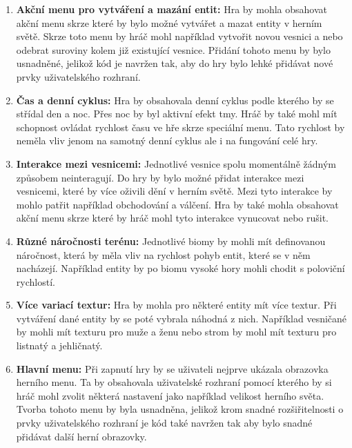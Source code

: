 \begin{enumerate}
    \item \textbf{Akční menu pro vytváření a mazání entit:} Hra by mohla obsahovat akční menu skrze které by bylo možné vytvářet a mazat entity v herním světě. Skrze toto menu by hráč mohl například vytvořit novou vesnici a nebo odebrat suroviny kolem již existující vesnice. Přidání tohoto menu by bylo usnadněné, jelikož kód je navržen tak, aby do hry bylo lehké přidávat nové prvky uživatelského rozhraní. 

    \item \textbf{Čas a denní cyklus:} Hra by obsahovala denní cyklus podle kterého by se střídal den a noc. Přes noc by byl aktivní efekt tmy. Hráč by také mohl mít schopnost ovládat rychlost času ve hře skrze speciální menu. Tato rychlost by neměla vliv jenom na samotný denní cyklus ale i na fungování celé hry.

    \item \textbf{Interakce mezi vesnicemi:} Jednotlivé vesnice spolu momentálně žádným způsobem neinteragují. Do hry by bylo možné přidat interakce mezi vesnicemi, které by více oživili dění v herním světě. Mezi tyto interakce by mohlo patřit například obchodování a válčení. Hra by také mohla obsahovat akční menu skrze které by hráč mohl tyto interakce vynucovat nebo rušit.

    \item \textbf{Různé náročnosti terénu:} Jednotlivé biomy by mohli mít definovanou náročnost, která by měla vliv na rychlost pohyb entit, které se v něm nacházejí. Například entity by po biomu vysoké hory mohli chodit s poloviční rychlostí.

    \item \textbf{Více variací textur:} Hra by mohla pro některé entity mít více textur. Při vytváření dané entity by se poté vybrala náhodná z nich. Například vesničané by mohli mít texturu pro muže a ženu nebo strom by mohl mít texturu pro listnatý a jehličnatý.

    \item \textbf{Hlavní menu:} Při zapnutí hry by se uživateli nejprve ukázala obrazovka herního menu. Ta by obsahovala uživatelské rozhraní pomocí kterého by si hráč mohl zvolit některá nastavení jako například velikost herního světa. Tvorba tohoto menu by byla usnadněna, jelikož krom snadné rozšiřitelnosti o prvky uživatelského rozhraní je kód také navržen tak aby bylo snadné přidávat další herní obrazovky.
\end{enumerate}

